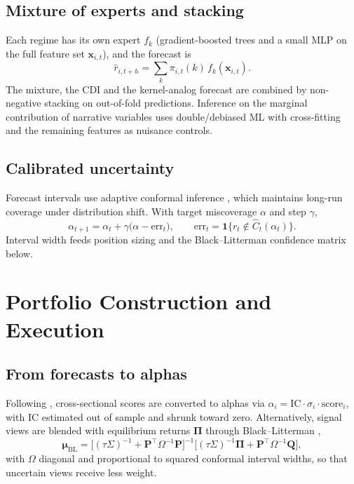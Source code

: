 \documentclass[11pt,a4paper]{article}
\theoremstyle{plain}
\theoremstyle{definition}
\theoremstyle{remark}
\newcommand{\x}{\bm{x}}
\newcommand{\ind}{\mathbf{1}}
\begin{document}
\subsection{Mixture of experts and stacking}
Each regime has its own expert $f_k$ (gradient-boosted trees and a small MLP on the full feature set $\x_{i,t}$), and the forecast is
\begin{equation}
  \hat r_{i,t+h}=\sum_{k}\pi_{i,t}(k)\,f_k(\x_{i,t}).
\end{equation}
The mixture, the CDI and the kernel-analog forecast are combined by non-negative stacking on out-of-fold predictions. Inference on the marginal contribution of narrative variables uses double/debiased ML \citep{chernozhukov2018} with cross-fitting and the remaining features as nuisance controls.

\subsection{Calibrated uncertainty}
Forecast intervals use adaptive conformal inference \citep{gibbs2021,angelopoulos2021}, which maintains long-run coverage under distribution shift. With target miscoverage $\alpha$ and step $\gamma$,
\begin{equation}
  \alpha_{t+1}=\alpha_t+\gamma\big(\alpha-\mathrm{err}_t\big),\qquad \mathrm{err}_t=\ind\{r_t\notin\hat C_t(\alpha_t)\}.
\end{equation}
Interval width feeds position sizing and the Black--Litterman confidence matrix below.

\section{Portfolio Construction and Execution}\label{sec:portfolio}

\subsection{From forecasts to alphas}
Following \citet{grinold2000}, cross-sectional scores are converted to alphas via $\alpha_i=\mathrm{IC}\cdot\sigma_i\cdot\mathrm{score}_i$, with IC estimated out of sample and shrunk toward zero. Alternatively, signal views are blended with equilibrium returns $\bm\Pi$ through Black--Litterman \citep{black1992},
\begin{equation}
  \bm\mu_{\mathrm{BL}}=\big[(\tau\Sigma)^{-1}+\bm P^\top\Omega^{-1}\bm P\big]^{-1}\big[(\tau\Sigma)^{-1}\bm\Pi+\bm P^\top\Omega^{-1}\bm Q\big],
\end{equation}
with $\Omega$ diagonal and proportional to squared conformal interval widths, so that uncertain views receive less weight.
\end{document}
